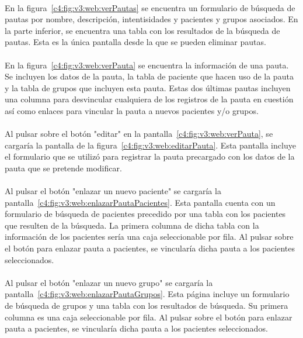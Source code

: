 \paragraph{}
En la figura~\ref{c4:fig:v3:web:verPautas} se encuentra un formulario de búsqueda de pautas por nombre, descripción, intentisidades y pacientes y grupos asociados. En la parte inferior, se encuentra una tabla con los resultados de la búsqueda de pautas. Esta es la única pantalla desde la que se pueden eliminar pautas.

\paragraph{}
En la figura~\ref{c4:fig:v3:web:verPauta} se encuentra la información de una pauta. Se incluyen los datos de la pauta, la tabla de paciente que hacen uso de la pauta y la tabla de grupos que incluyen esta pauta. Estas dos últimas pautas incluyen una columna para desvincular cualquiera de los registros de la pauta en cuestión así como enlaces para vincular la pauta a nuevos pacientes y/o grupos.

\paragraph{}
Al pulsar sobre el botón "editar" en la pantalla~\ref{c4:fig:v3:web:verPauta}, se cargaría la pantalla de la figura~\ref{c4:fig:v3:web:editarPauta}. Esta pantalla incluye el formulario que se utilizó para registrar la pauta precargado con los datos de la pauta que se pretende modificar.

\paragraph{}
Al pulsar el botón "enlazar un nuevo paciente" se cargaría la pantalla~\ref{c4:fig:v3:web:enlazarPautaPacientes}. Esta pantalla cuenta con un formulario de búsqueda de pacientes precedido por una tabla con los pacientes que resulten de la búsqueda. La primera columna de dicha tabla con la información de los pacientes sería una caja seleccionable por fila. Al pulsar sobre el botón para enlazar pauta a pacientes, se vincularía dicha pauta a los pacientes seleccionados.

\paragraph{}
Al pulsar el botón "enlazar un nuevo grupo" se cargaría la pantalla~\ref{c4:fig:v3:web:enlazarPautaGrupos}. Esta página incluye un formulario de búsqueda de grupos y una tabla con los resultados de búsqueda. Su primera columna es una caja seleccionable por fila. Al pulsar sobre el botón para enlazar pauta a pacientes, se vincularía dicha pauta a los pacientes seleccionados.

